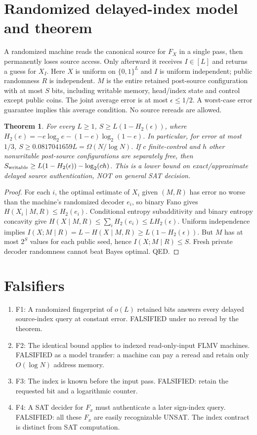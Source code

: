 \documentclass[11pt]{article}
\newtheorem{theorem}{Theorem}
\begin{document}
\section*{Randomized delayed-index model and theorem}
A randomized machine reads the canonical source for $F_X$ in a single pass, then permanently loses source access. Only afterward it receives $I\in[L]$ and returns a guess for $X_I$. Here $X$ is uniform on $\{0,1\}^L$ and $I$ is uniform independent; public randomness $R$ is independent. $M$ is the entire retained post-source configuration with at most $S$ bits, including writable memory, head/index state and control except public coins. The joint average error is at most $\epsilon\le 1/2$. A worst-case error guarantee implies this average condition. No source rereads are allowed.
\begin{theorem}
For every $L\ge1$, $S\ge L(1-H_2(\epsilon))$, where $H_2(e)=-e\log_2e-(1-e)\log_2(1-e)$. In particular, for error at most $1/3$, $S\ge0.0817041659L=\Omega(N/\log N)$. If $c$ finite-control and $h$ other nonwritable post-source configurations are separately free, then $S_{\rm writable}\ge L(1-H_2(\epsilon))-\log_2(ch)$. This is a lower bound on exact/approximate delayed source authentication, NOT on general SAT decision.
\end{theorem}
\begin{proof}
For each $i$, the optimal estimate of $X_i$ given $(M,R)$ has error no worse than the machine's randomized decoder $e_i$, so binary Fano gives $H(X_i\mid M,R)\le H_2(e_i)$. Conditional entropy subadditivity and binary entropy concavity give $H(X\mid M,R)\le\sum_i H_2(e_i)\le L H_2(\epsilon)$. Uniform independence implies $I(X;M\mid R)=L-H(X\mid M,R)\ge L(1-H_2(\epsilon))$. But $M$ has at most $2^S$ values for each public seed, hence $I(X;M\mid R)\le S$. Fresh private decoder randomness cannot beat Bayes optimal. QED.
\end{proof}
\section*{Falsifiers}
\begin{enumerate}
\item[] F1: A randomized fingerprint of $o(L)$ retained bits answers every delayed source-index query at constant error. FALSIFIED under no reread by the theorem.
\item[] F2: The identical bound applies to indexed read-only-input FLMV machines. FALSIFIED as a model transfer: a machine can pay a reread and retain only $O(\log N)$ address memory.
\item[] F3: The index is known before the input pass. FALSIFIED: retain the requested bit and a logarithmic counter.
\item[] F4: A SAT decider for $F_x$ must authenticate a later sign-index query. FALSIFIED: all these $F_x$ are easily recognizable UNSAT. The index contract is distinct from SAT computation.
\end{enumerate}
\end{document}
